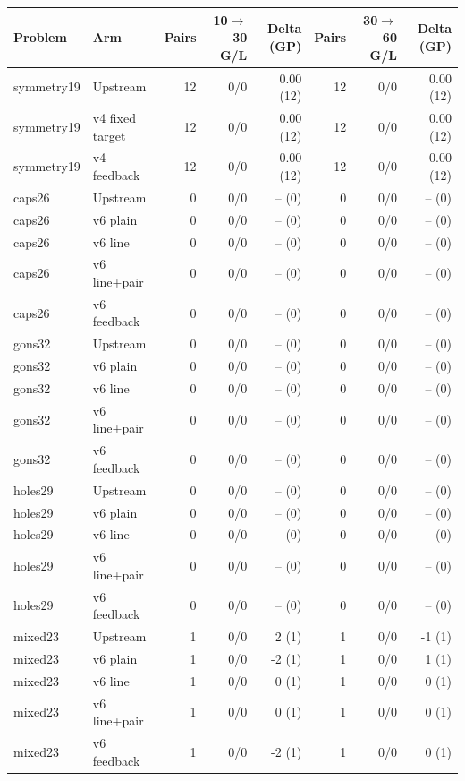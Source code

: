 \documentclass[10pt,a4paper]{article}
\begin{document}
\begin{center}\small\begin{longtable}{llrrrrrr}
\toprule
Problem & Arm & Pairs & 10$\to$30 G/L & Delta (GP) & Pairs & 30$\to$60 G/L & Delta (GP) \\
\midrule\endhead
symmetry19 & Upstream & 12 & 0/0 & 0.00 (12) & 12 & 0/0 & 0.00 (12) \\
symmetry19 & v4 fixed target & 12 & 0/0 & 0.00 (12) & 12 & 0/0 & 0.00 (12) \\
symmetry19 & v4 feedback & 12 & 0/0 & 0.00 (12) & 12 & 0/0 & 0.00 (12) \\
caps26 & Upstream & 0 & 0/0 & -- (0) & 0 & 0/0 & -- (0) \\
caps26 & v6 plain & 0 & 0/0 & -- (0) & 0 & 0/0 & -- (0) \\
caps26 & v6 line & 0 & 0/0 & -- (0) & 0 & 0/0 & -- (0) \\
caps26 & v6 line+pair & 0 & 0/0 & -- (0) & 0 & 0/0 & -- (0) \\
caps26 & v6 feedback & 0 & 0/0 & -- (0) & 0 & 0/0 & -- (0) \\
gons32 & Upstream & 0 & 0/0 & -- (0) & 0 & 0/0 & -- (0) \\
gons32 & v6 plain & 0 & 0/0 & -- (0) & 0 & 0/0 & -- (0) \\
gons32 & v6 line & 0 & 0/0 & -- (0) & 0 & 0/0 & -- (0) \\
gons32 & v6 line+pair & 0 & 0/0 & -- (0) & 0 & 0/0 & -- (0) \\
gons32 & v6 feedback & 0 & 0/0 & -- (0) & 0 & 0/0 & -- (0) \\
holes29 & Upstream & 0 & 0/0 & -- (0) & 0 & 0/0 & -- (0) \\
holes29 & v6 plain & 0 & 0/0 & -- (0) & 0 & 0/0 & -- (0) \\
holes29 & v6 line & 0 & 0/0 & -- (0) & 0 & 0/0 & -- (0) \\
holes29 & v6 line+pair & 0 & 0/0 & -- (0) & 0 & 0/0 & -- (0) \\
holes29 & v6 feedback & 0 & 0/0 & -- (0) & 0 & 0/0 & -- (0) \\
mixed23 & Upstream & 1 & 0/0 & 2 (1) & 1 & 0/0 & -1 (1) \\
mixed23 & v6 plain & 1 & 0/0 & -2 (1) & 1 & 0/0 & 1 (1) \\
mixed23 & v6 line & 1 & 0/0 & 0 (1) & 1 & 0/0 & 0 (1) \\
mixed23 & v6 line+pair & 1 & 0/0 & 0 (1) & 1 & 0/0 & 0 (1) \\
mixed23 & v6 feedback & 1 & 0/0 & -2 (1) & 1 & 0/0 & 0 (1) \\
\bottomrule\end{longtable}\end{center}
\end{document}
